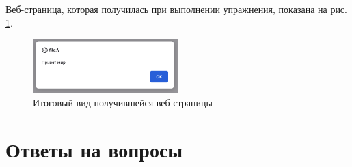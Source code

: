 \documentclass[a4paper, 14pt]{extarticle}
\begin{document}
Веб-страница, которая получилась при выполнении упражнения, показана на рис.
\ref{fig:task-3}.

\begin{figure}[H]
  \centering
  \includegraphics[width=0.5\textwidth]{images/task-3.png}
  \caption{Итоговый вид получившейся веб-страницы}
  \label{fig:task-3}
\end{figure}

\section{Ответы на вопросы}
\end{document}

